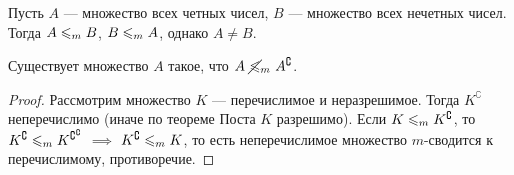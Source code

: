 \begin{corollary}
    Пусть $A$ --- множество всех четных чисел, $B$ --- множество всех нечетных чисел.
    Тогда $A \leqslant_{m} B$, $B \leqslant_{m} A$, однако $A \neq B$.
\end{corollary}

\begin{corollary}
    Существует множество $A$ такое, что $A~\cancel{\leqslant}_{m}~A^{\complement}$.
\end{corollary}
\begin{proof}
    Рассмотрим множество $K$ --- перечислимое и неразрешимое.
    Тогда $K^{\complement}$ неперечислимо (иначе по теореме Поста $K$ разрешимо).
    Если $K \leqslant_{m} K^{\complement}$, то $K^{\complement} \leqslant_{m} K^{\complement^{\complement}}$ $\implies$ $K^{\complement} \leqslant_{m} K$, то есть неперечислимое множество $m$-сводится к перечислимому, противоречие.
\end{proof}

